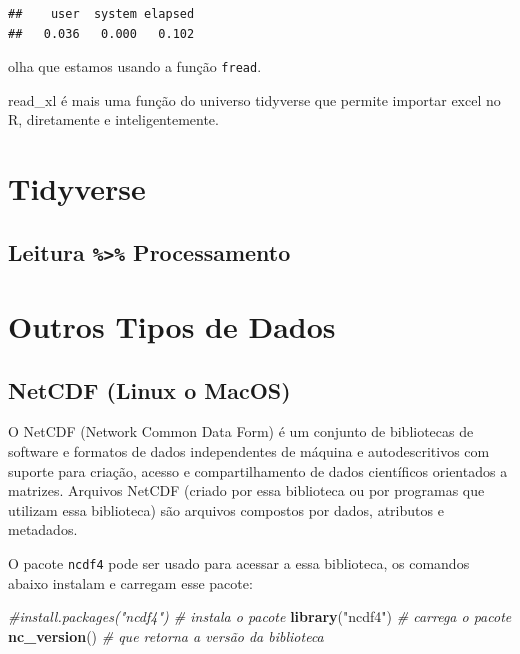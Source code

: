 \documentclass[]{book}
\newenvironment{Shaded}{\begin{snugshade}}{\end{snugshade}}
\newcommand{\KeywordTok}[1]{\textcolor[rgb]{0.13,0.29,0.53}{\textbf{#1}}}
\newcommand{\StringTok}[1]{\textcolor[rgb]{0.31,0.60,0.02}{#1}}
\newcommand{\CommentTok}[1]{\textcolor[rgb]{0.56,0.35,0.01}{\textit{#1}}}
\newcommand{\NormalTok}[1]{#1}
\theoremstyle{definition}
\theoremstyle{definition}
\theoremstyle{definition}
\theoremstyle{remark}
\begin{document}
\begin{verbatim}
##    user  system elapsed 
##   0.036   0.000   0.102
\end{verbatim}

olha que estamos usando a função \texttt{fread}.

read\_xl é mais uma função do universo tidyverse que permite importar
excel no R, diretamente e inteligentemente.

\section{Tidyverse}\label{tidyverse}

\subsection{\texorpdfstring{Leitura \texttt{\%\textgreater{}\%}
Processamento}{Leitura \%\textgreater{}\% Processamento}}\label{leitura-processamento}

\section{Outros Tipos de Dados}\label{outros-tipos-de-dados}

\subsection{NetCDF (Linux o MacOS)}\label{netcdf-linux-o-macos}

O NetCDF (Network Common Data Form) é um conjunto de bibliotecas de
software e formatos de dados independentes de máquina e autodescritivos
com suporte para criação, acesso e compartilhamento de dados científicos
orientados a matrizes. Arquivos NetCDF (criado por essa biblioteca ou
por programas que utilizam essa biblioteca) são arquivos compostos por
dados, atributos e metadados.

O pacote \texttt{ncdf4} pode ser usado para acessar a essa biblioteca,
os comandos abaixo instalam e carregam esse pacote:

\begin{Shaded}
\begin{Highlighting}[]
\CommentTok{#install.packages("ncdf4") # instala o pacote}
\KeywordTok{library}\NormalTok{(}\StringTok{"ncdf4"}\NormalTok{)          }\CommentTok{# carrega o pacote}
\KeywordTok{nc_version}\NormalTok{()              }\CommentTok{# que retorna a versão da biblioteca}
\end{Highlighting}
\end{Shaded}
\end{document}
